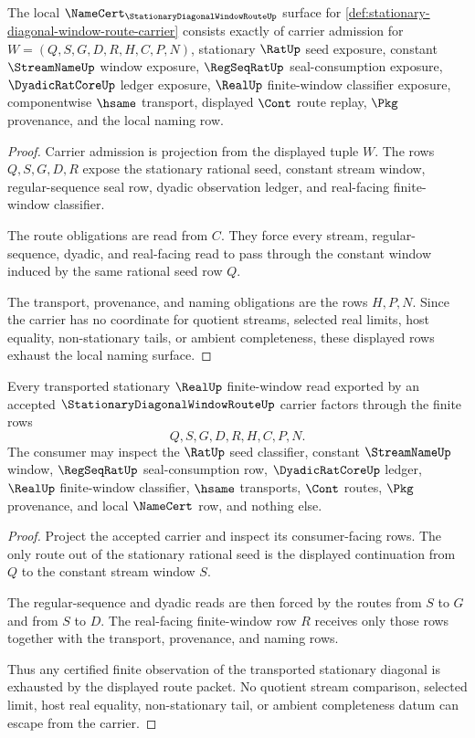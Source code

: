 \begin{theorem}
\label{thm:stationary-diagonal-window-route-namecert-obligations}
The local $\NameCert_{\StationaryDiagonalWindowRouteUp}$ surface for \autoref{def:stationary-diagonal-window-route-carrier} consists exactly of carrier admission for $W=(Q,S,G,D,R,H,C,P,N)$, stationary $\RatUp$ seed exposure, constant $\StreamNameUp$ window exposure, $\RegSeqRatUp$ seal-consumption exposure, $\DyadicRatCoreUp$ ledger exposure, $\RealUp$ finite-window classifier exposure, componentwise $\hsame$ transport, displayed $\Cont$ route replay, $\Pkg$ provenance, and the local naming row.
\end{theorem}
\begin{proof}
Carrier admission is projection from the displayed tuple $W$. The rows $Q,S,G,D,R$ expose the stationary rational seed, constant stream window, regular-sequence seal row, dyadic observation ledger, and real-facing finite-window classifier.

The route obligations are read from $C$. They force every stream, regular-sequence, dyadic, and real-facing read to pass through the constant window induced by the same rational seed row $Q$.

The transport, provenance, and naming obligations are the rows $H,P,N$. Since the carrier has no coordinate for quotient streams, selected real limits, host equality, non-stationary tails, or ambient completeness, these displayed rows exhaust the local naming surface.
\end{proof}

\begin{theorem}
\label{thm:stationary-diagonal-window-route-nonescape}
Every transported stationary $\RealUp$ finite-window read exported by an accepted $\StationaryDiagonalWindowRouteUp$ carrier factors through the finite rows
$$
Q,S,G,D,R,H,C,P,N.
$$
The consumer may inspect the $\RatUp$ seed classifier, constant $\StreamNameUp$ window, $\RegSeqRatUp$ seal-consumption row, $\DyadicRatCoreUp$ ledger, $\RealUp$ finite-window classifier, $\hsame$ transports, $\Cont$ routes, $\Pkg$ provenance, and local $\NameCert$ row, and nothing else.
\end{theorem}
\begin{proof}
Project the accepted carrier and inspect its consumer-facing rows. The only route out of the stationary rational seed is the displayed continuation from $Q$ to the constant stream window $S$.

The regular-sequence and dyadic reads are then forced by the routes from $S$ to $G$ and from $S$ to $D$. The real-facing finite-window row $R$ receives only those rows together with the transport, provenance, and naming rows.

Thus any certified finite observation of the transported stationary diagonal is exhausted by the displayed route packet. No quotient stream comparison, selected limit, host real equality, non-stationary tail, or ambient completeness datum can escape from the carrier.
\end{proof}


